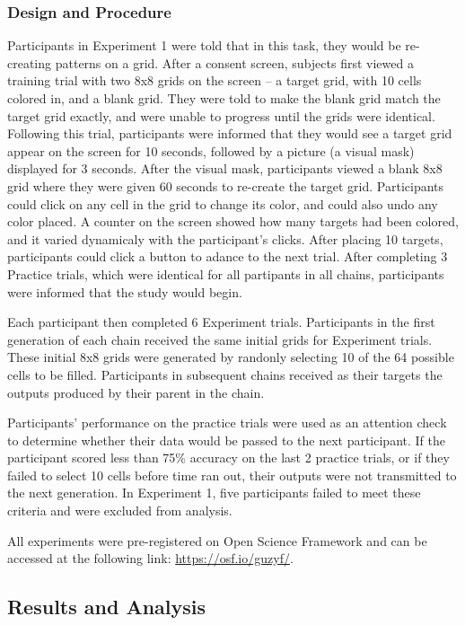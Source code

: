 \documentclass[10pt, letterpaper]{article}
\begin{document}
\subsubsection{Design and Procedure}\label{design-and-procedure}

Participants in Experiment 1 were told that in this task, they would be
re-creating patterns on a grid. After a consent screen, subjects first
viewed a training trial with two 8x8 grids on the screen -- a target
grid, with 10 cells colored in, and a blank grid. They were told to make
the blank grid match the target grid exactly, and were unable to
progress until the grids were identical. Following this trial,
participants were informed that they would see a target grid appear on
the screen for 10 seconds, followed by a picture (a visual mask)
displayed for 3 seconds. After the visual mask, participants viewed a
blank 8x8 grid where they were given 60 seconds to re-create the target
grid. Participants could click on any cell in the grid to change its
color, and could also undo any color placed. A counter on the screen
showed how many targets had been colored, and it varied dynamicaly with
the participant's clicks. After placing 10 targets, participants could
click a button to adance to the next trial. After completing 3 Practice
trials, which were identical for all partipants in all chains,
participants were informed that the study would begin.

Each participant then completed 6 Experiment trials. Participants in the
first generation of each chain received the same initial grids for
Experiment trials. These initial 8x8 grids were generated by randonly
selecting 10 of the 64 possible cells to be filled. Participants in
subsequent chains received as their targets the outputs produced by
their parent in the chain.

Participants' performance on the practice trials were used as an
attention check to determine whether their data would be passed to the
next participant. If the participant scored less than 75\% accuracy on
the last 2 practice trials, or if they failed to select 10 cells before
time ran out, their outputs were not transmitted to the next generation.
In Experiment 1, five participants failed to meet these criteria and
were excluded from analysis.

All experiments were pre-registered on Open Science Framework and can be
accessed at the following link: \url{https://osf.io/guzyf/}.

\subsection{Results and Analysis}\label{results-and-analysis}
\end{document}
